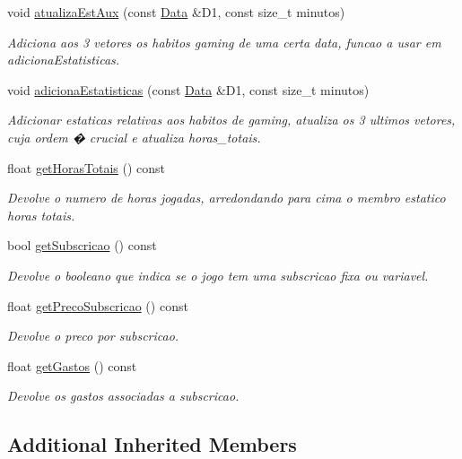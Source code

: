 \begin{DoxyCompactItemize}
void \hyperlink{classOnline_a1796bfbb1c3210f26ca8e1cddc61d830}{atualiza\+Est\+Aux} (const \hyperlink{classData}{Data} \&D1, const size\+\_\+t minutos)
\begin{DoxyCompactList}\small\item\em Adiciona aos 3 vetores os habitos gaming de uma certa data, funcao a usar em adiciona\+Estatisticas. \end{DoxyCompactList}\item 
void \hyperlink{classOnline_aac2ef3483edfaa8426363ebdd542dc38}{adiciona\+Estatisticas} (const \hyperlink{classData}{Data} \&D1, const size\+\_\+t minutos)
\begin{DoxyCompactList}\small\item\em Adicionar estaticas relativas aos habitos de gaming, atualiza os 3 ultimos vetores, cuja ordem � crucial e atualiza horas\+\_\+totais. \end{DoxyCompactList}\item 
float \hyperlink{classOnline_ad0a23d2f1a2f804479ff346be0fdc686}{get\+Horas\+Totais} () const
\begin{DoxyCompactList}\small\item\em Devolve o numero de horas jogadas, arredondando para cima o membro estatico horas totais. \end{DoxyCompactList}\item 
bool \hyperlink{classOnline_aa222489df5a1e6bcfbf5e01d95178850}{get\+Subscricao} () const
\begin{DoxyCompactList}\small\item\em Devolve o booleano que indica se o jogo tem uma subscricao fixa ou variavel. \end{DoxyCompactList}\item 
float \hyperlink{classOnline_a0f7240aa5582e10579d0719e4fa5d705}{get\+Preco\+Subscricao} () const
\begin{DoxyCompactList}\small\item\em Devolve o preco por subscricao. \end{DoxyCompactList}\item 
float \hyperlink{classOnline_ac3a2197523ee26effcacd9a2a9fe968e}{get\+Gastos} () const
\begin{DoxyCompactList}\small\item\em Devolve os gastos associadas a subscricao. \end{DoxyCompactList}\end{DoxyCompactItemize}
\subsection*{Additional Inherited Members}


